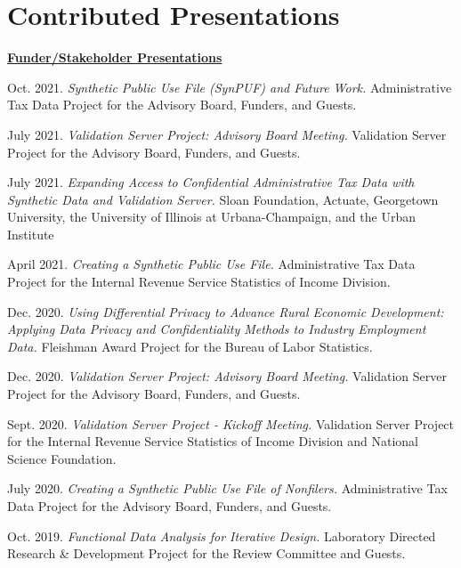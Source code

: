 \documentclass[11pt, letterpaper, roman]{moderncv} %
\begin{document}
\section{Contributed Presentations}
\underline{\textbf{\large Funder/Stakeholder Presentations}}\normalsize
\vspace{4pt}
\begin{etaremune}[topsep=0pt, itemsep=3pt, partopsep=0pt, parsep=0pt]
    \item Oct. 2021. \textit{Synthetic Public Use File (SynPUF) and Future Work.} Administrative Tax Data Project for the Advisory Board, Funders, and Guests.
    
    \item July 2021. \textit{Validation Server Project: Advisory Board Meeting.} Validation Server Project for the Advisory Board, Funders, and Guests.
    
    \item July 2021. \textit{Expanding Access to Confidential Administrative Tax Data with Synthetic Data and Validation Server.} Sloan Foundation, Actuate, Georgetown University, the University of Illinois at Urbana-Champaign, and the Urban Institute
    
    \item April 2021. \textit{Creating a Synthetic Public Use File.} Administrative Tax Data Project for the Internal Revenue Service Statistics of Income Division.

    \item Dec. 2020. \textit{Using Differential Privacy to Advance Rural Economic Development: Applying Data Privacy and Confidentiality Methods to Industry Employment Data.} Fleishman Award Project for the Bureau of Labor Statistics.
    
    \item Dec. 2020. \textit{Validation Server Project: Advisory Board Meeting.} Validation Server Project for the Advisory Board, Funders, and Guests.
    
    \item Sept. 2020. \textit{Validation Server Project - Kickoff Meeting.} Validation Server Project for the Internal Revenue Service Statistics of Income Division and National Science Foundation.
    
    \item July 2020. \textit{Creating a Synthetic Public Use File of Nonfilers.} Administrative Tax Data Project for the Advisory Board, Funders, and Guests.
    
    \item Oct. 2019. \textit{Functional Data Analysis for Iterative Design.} Laboratory Directed Research \& Development Project for the Review Committee and Guests.


\end{etaremune}
\end{document}
